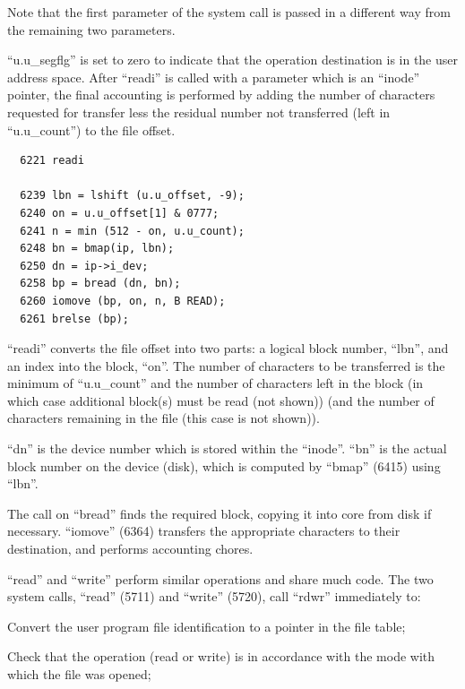 Note that the first parameter of the
system call is passed in a different
way from the remaining two parameters.


``u.u\_segflg'' is set to zero to indicate
that the operation destination is in
the user address space. After ``readi''
is called with a parameter which is an
``inode'' pointer, the final accounting
is performed by adding the number of
characters requested for transfer less
the residual number not transferred
(left in ``u.u\_count'') to the file
offset.

\begin{verbatim}
  6221 readi

  6239 lbn = lshift (u.u_offset, -9);
  6240 on = u.u_offset[1] & 0777;
  6241 n = min (512 - on, u.u_count);
  6248 bn = bmap(ip, lbn);
  6250 dn = ip->i_dev;
  6258 bp = bread (dn, bn);
  6260 iomove (bp, on, n, B READ);
  6261 brelse (bp);

\end{verbatim}

``readi'' converts the file offset into
two parts: a logical block number,
``lbn'', and an index into the block,
``on''. The number of characters to be
transferred is the minimum of
``u.u\_count'' and the number of characters left in the block (in which case
additional block(s) must be read (not
shown)) (and the number of characters
remaining in the file (this case is not
shown)).

``dn'' is the device number which is
stored within the ``inode''. ``bn'' is the
actual block number on the device
(disk), which is computed by ``bmap''
(6415) using ``lbn''.

The call on ``bread'' finds the required
block, copying it into core from disk
if necessary. ``iomove'' (6364)
transfers the appropriate characters to
their destination, and performs
accounting chores.




``read'' and ``write'' perform similar
operations and share much code. The
two system calls, ``read'' (5711) and
``write'' (5720), call ``rdwr'' immediately
to:

\bd
\item[5736:] Convert the user program file
 identification to a pointer in
 the file table;

\item[5739:] Check that the operation (read or
 write) is in accordance with the
 mode with which the file was
 opened;

